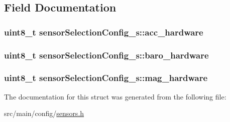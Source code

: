\subsection{Field Documentation}
\hypertarget{structsensorSelectionConfig__s_a56ed81e3b2343ecef89ae9c4a41bf50c}{
\subsubsection[{acc\+\_\+hardware}]{\setlength{\rightskip}{0pt plus 5cm}uint8\+\_\+t sensor\+Selection\+Config\+\_\+s\+::acc\+\_\+hardware}}\label{structsensorSelectionConfig__s_a56ed81e3b2343ecef89ae9c4a41bf50c}
\hypertarget{structsensorSelectionConfig__s_afa00ae561019b3621f2ba67cec868f4c}{
\subsubsection[{baro\+\_\+hardware}]{\setlength{\rightskip}{0pt plus 5cm}uint8\+\_\+t sensor\+Selection\+Config\+\_\+s\+::baro\+\_\+hardware}}\label{structsensorSelectionConfig__s_afa00ae561019b3621f2ba67cec868f4c}
\hypertarget{structsensorSelectionConfig__s_ad4a9d0d918534bb78a27bb2686067896}{
\subsubsection[{mag\+\_\+hardware}]{\setlength{\rightskip}{0pt plus 5cm}uint8\+\_\+t sensor\+Selection\+Config\+\_\+s\+::mag\+\_\+hardware}}\label{structsensorSelectionConfig__s_ad4a9d0d918534bb78a27bb2686067896}


The documentation for this struct was generated from the following file\+:\begin{DoxyCompactItemize}
\item 
src/main/config/\hyperlink{sensors_8h}{sensors.\+h}\end{DoxyCompactItemize}

